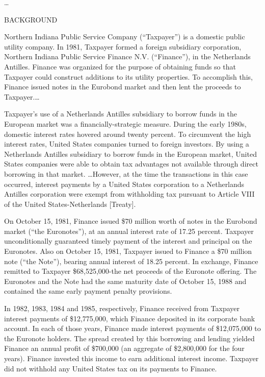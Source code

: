  \begin{select}
\ldots 
\begin{center} BACKGROUND
\end{center}
Northern Indiana Public Service Company (``Taxpayer'') is a domestic public utility company. In 1981, Taxpayer formed a foreign subsidiary corporation, Northern Indiana Public Service Finance N.V. (``Finance''), in the Netherlands Antilles. Finance was organized for the purpose of obtaining funds so that Taxpayer could construct additions to its utility properties. To accomplish this, Finance issued notes in the Eurobond market and then lent the proceeds to Taxpayer.\ldots 

Taxpayer's use of a Netherlands Antilles subsidiary to borrow funds in the European market was a financially-strategic measure. During the early 1980s, domestic interest rates hovered around twenty percent. To circumvent the high interest rates, United States companies turned to foreign investors. By using a Netherlands Antilles subsidiary to borrow funds in the European market, United States companies were able to obtain tax advantages not available through direct borrowing in that market.  \ldots  However, at the time the transactions in this case occurred, interest payments by a United States corporation to a Netherlands Antilles corporation were exempt from withholding tax pursuant to Article VIII of the United States-Netherlands [Treaty].

On October 15, 1981, Finance issued \$70 million worth of notes in the Eurobond market (``the Euronotes''), at an annual interest rate of 17.25 percent. Taxpayer unconditionally guaranteed timely payment of the interest and principal on the Euronotes. Also on October 15, 1981, Taxpayer issued to Finance a \$70 million note (``the Note''), bearing annual interest of 18.25 percent. In exchange, Finance remitted to Taxpayer \$68,525,000-the net proceeds of the Euronote offering. The Euronotes and the Note had the same maturity date of October 15, 1988 and contained the same early payment penalty provisions.

In 1982, 1983, 1984 and 1985, respectively, Finance received from Taxpayer interest payments of \$12,775,000, which Finance deposited in its corporate bank account. In each of those years, Finance made interest payments of \$12,075,000 to the Euronote holders. The spread created by this borrowing and lending yielded Finance an annual profit of \$700,000 (an aggregate of \$2,800,000 for the four years). Finance invested this income to earn additional interest income. Taxpayer did not withhold any United States tax on its payments to Finance.


\end{select}
